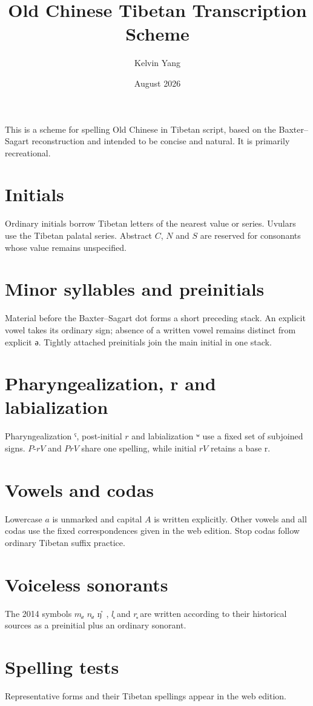 \documentclass[11pt]{article}
\title{Old Chinese Tibetan Transcription Scheme}
\author{Kelvin Yang}
\date{August 2026}
\begin{document}
\maketitle

This is a scheme for spelling Old Chinese in Tibetan script, based on the Baxter--Sagart reconstruction and intended to be concise and natural. It is primarily recreational.

\section{Initials}
Ordinary initials borrow Tibetan letters of the nearest value or series. Uvulars use the Tibetan palatal series. Abstract $C$, $N$ and $S$ are reserved for consonants whose value remains unspecified.

\section{Minor syllables and preinitials}
Material before the Baxter--Sagart dot forms a short preceding stack. An explicit vowel takes its ordinary sign; absence of a written vowel remains distinct from explicit $ə$. Tightly attached preinitials join the main initial in one stack.

\section{Pharyngealization, r and labialization}
Pharyngealization $ˤ$, post-initial $r$ and labialization $ʷ$ use a fixed set of subjoined signs. $P$-$rV$ and $PrV$ share one spelling, while initial $rV$ retains a base r.

\section{Vowels and codas}
Lowercase $a$ is unmarked and capital $A$ is written explicitly. Other vowels and all codas use the fixed correspondences given in the web edition. Stop codas follow ordinary Tibetan suffix practice.

\section{Voiceless sonorants}
The 2014 symbols $m̥$, $n̥$, $ŋ̊$, $l̥$ and $r̥$ are written according to their historical sources as a preinitial plus an ordinary sonorant.

\section{Spelling tests}
Representative forms and their Tibetan spellings appear in the web edition.
\end{document}
